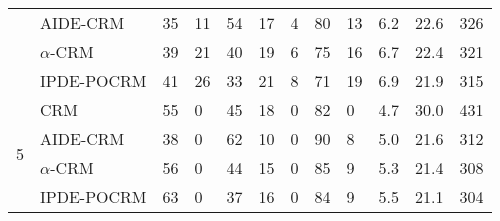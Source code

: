 \begin{tabular*}{\textwidth}{@{\extracolsep\fill}clllllllllll@{\extracolsep\fill}}
 & AIDE-CRM & 35 & 11 & 54 & 17 & 4 & 80 & 13 & 6.2 & 22.6 & 326\\
 & $\alpha$-CRM & 39 & 21 & 40 & 19 & 6 & 75 & 16 & 6.7 & 22.4 & 321\\
 & IPDE-POCRM & 41 & 26 & 33 & 21 & 8 & 71 & 19 & 6.9 & 21.9 & 315\\
\midrule
\multirow{4}{2em}{5} & CRM & 55 & 0 & 45 & 18 & 0 & 82 & 0 & 4.7 & 30.0 & 431\\
 & AIDE-CRM & 38 & 0 & 62 & 10 & 0 & 90 & 8 & 5.0 & 21.6 & 312\\
 & $\alpha$-CRM & 56 & 0 & 44 & 15 & 0 & 85 & 9 & 5.3 & 21.4 & 308\\
 & IPDE-POCRM & 63 & 0 & 37 & 16 & 0 & 84 & 9 & 5.5 & 21.1 & 304\\
\bottomrule
\end{tabular*}
